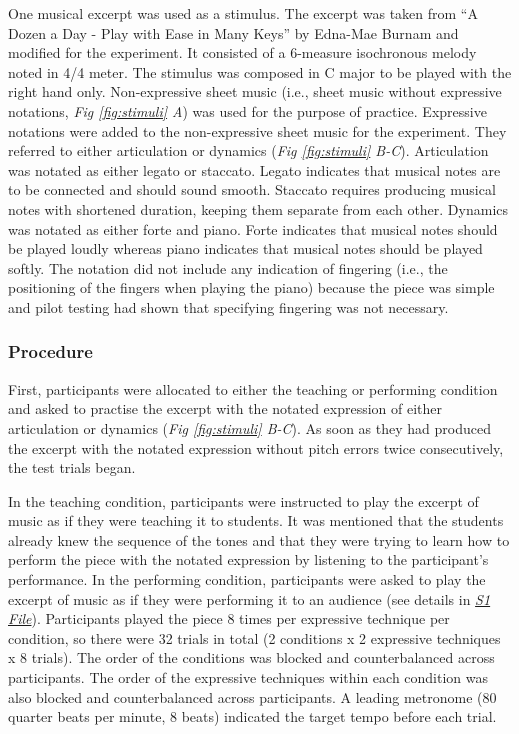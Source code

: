 \documentclass[
  english,
  man,floatsintext]{apa6}
\begin{document}
One musical excerpt was used as a stimulus. The excerpt was taken from ``A Dozen a Day - Play with Ease in Many Keys'' by Edna-Mae Burnam and modified for the experiment. It consisted of a 6-measure isochronous melody noted in 4/4 meter. The stimulus was composed in C major to be played with the right hand only. Non-expressive sheet music (i.e., sheet music without expressive notations, \emph{Fig \ref{fig:stimuli} A}) was used for the purpose of practice. Expressive notations were added to the non-expressive sheet music for the experiment. They referred to either articulation or dynamics (\emph{Fig \ref{fig:stimuli} B-C}). Articulation was notated as either legato or staccato. Legato indicates that musical notes are to be connected and should sound smooth. Staccato requires producing musical notes with shortened duration, keeping them separate from each other. Dynamics was notated as either forte and piano. Forte indicates that musical notes should be played loudly whereas piano indicates that musical notes should be played softly. The notation did not include any indication of fingering (i.e., the positioning of the fingers when playing the piano) because the piece was simple and pilot testing had shown that specifying fingering was not necessary.

\hypertarget{procedure}{%
\subsubsection{Procedure}\label{procedure}}

First, participants were allocated to either the teaching or performing condition and asked to practise the excerpt with the notated expression of either articulation or dynamics (\emph{Fig \ref{fig:stimuli} B-C}). As soon as they had produced the excerpt with the notated expression without pitch errors twice consecutively, the test trials began.

In the teaching condition, participants were instructed to play the excerpt of music as if they were teaching it to students. It was mentioned that the students already knew the sequence of the tones and that they were trying to learn how to perform the piece with the notated expression by listening to the participant's performance. In the performing condition, participants were asked to play the excerpt of music as if they were performing it to an audience (see details in \emph{\protect\hyperlink{supplementary}{S1 File}}). Participants played the piece 8 times per expressive technique per condition, so there were 32 trials in total (2 conditions x 2 expressive techniques x 8 trials). The order of the conditions was blocked and counterbalanced across participants. The order of the expressive techniques within each condition was also blocked and counterbalanced across participants. A leading metronome (80 quarter beats per minute, 8 beats) indicated the target tempo before each trial.
\end{document}
